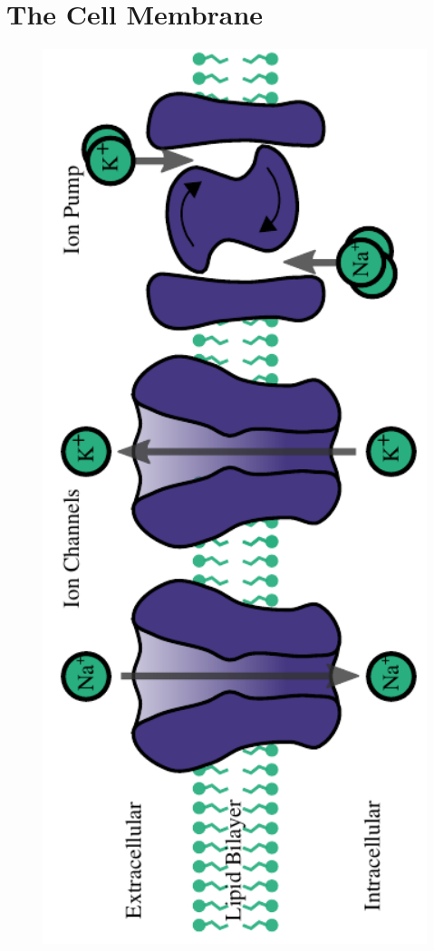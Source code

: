 \documentclass[altfont, fleqn]{uiophd}
\begin{document}
\section{The Cell Membrane}
\begin{figure}[h]
    \centering
    \includegraphics[angle=-90,width=1.0\textwidth]{images/2_1/ion_pumps_0.pdf}

\end{figure}
\end{document}
